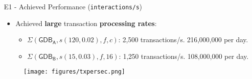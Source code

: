 \begin{frame}{E1 - Achieved Performance (\texttt{interactions/s})}

\begin{itemize}
    \item Achieved \textbf{large} transaction \textbf{processing rates}:
    \vspace{0.2em}
    \begin{itemize}
        \item $\Sigma(\mathsf{GDB_A}, s(120, 0.02), f, c)$: 2,500 transactions/s. 216,000,000 per day.
        \item $\Sigma(\mathsf{GDB_B}, s(15, 0.03), f, 16)$: 1,250 transactions/s. 108,000,000 per day.
    \end{itemize}
\end{itemize}
\begin{figure}
    \centering
    \texttt{[image: figures/txpersec.png]}
\end{figure}
\end{frame}

